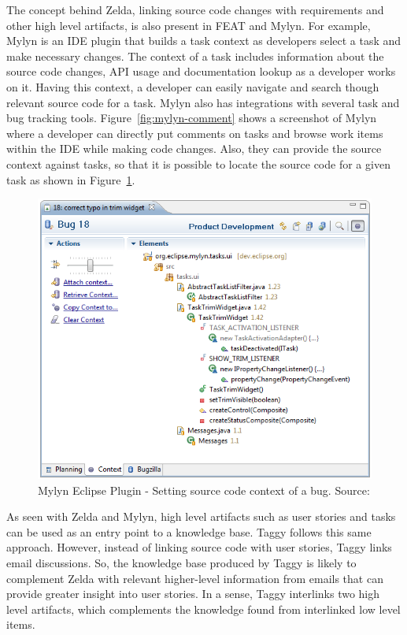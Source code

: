 The concept behind Zelda, linking source code changes with requirements and other high level artifacts, is also present in FEAT\cite{feat} and Mylyn\cite{mylyn}. For example, Mylyn is an IDE plugin that builds a task context as developers select a task and make necessary changes. The context of a task includes information about the source code changes, API usage and documentation lookup as a developer works on it. Having this context, a developer can easily navigate and search though relevant source code for a task. Mylyn also has integrations with several task and bug tracking tools. Figure~\ref{fig:mylyn-comment} shows a screenshot of Mylyn where a developer can directly put comments on tasks and browse work items within the IDE while making code changes. Also, they can provide the source context against tasks, so that it is possible to locate the source code for a given task as shown in Figure~\ref{fig:mylyn-context}.

\begin{figure}[!ht]
	\centering
	\includegraphics[width=\textwidth]{Mylyn-context.png}
    \caption{Mylyn Eclipse Plugin - Setting source code context of a bug. Source: \cite{mylyn}}
	\label{fig:mylyn-context}
\end{figure}


As seen with Zelda and Mylyn, high level artifacts such as user stories and tasks can be used as an entry point to a knowledge base. Taggy follows this same approach. However, instead of linking source code with user stories, Taggy links email discussions. So, the knowledge base produced by Taggy is likely to complement Zelda with relevant higher-level information from emails that can provide greater insight into user stories. In a sense, Taggy interlinks two high level artifacts, which complements the knowledge found from interlinked low level items.

